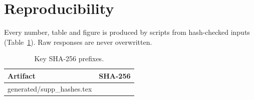\documentclass[10pt]{article}
\makeatletter
\newcommand{\inputtable}[1]{\@@input #1 }
\makeatother
\begin{document}
\section{Reproducibility}
Every number, table and figure is produced by scripts from hash-checked inputs
(Table~\ref{tab:hash}). Raw responses are never overwritten.

\begin{table}[h]\centering\small
\caption{Key SHA-256 prefixes.}\label{tab:hash}
\begin{tabular}{ll}\toprule Artifact & SHA-256\\\midrule
\inputtable{generated/supp_hashes.tex}
\bottomrule\end{tabular}\end{table}



\end{document}
